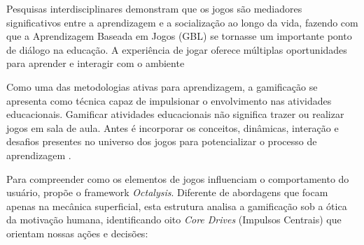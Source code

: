 Pesquisas interdisciplinares demonstram que os jogos são mediadores significativos entre a aprendizagem e a socialização ao longo da vida, fazendo com que a Aprendizagem Baseada em Jogos (GBL) se tornasse um importante ponto de diálogo na educação. A experiência de jogar oferece múltiplas oportunidades para aprender e interagir com o ambiente \cite{magtani2024design}

Como uma das metodologias ativas para aprendizagem, a gamificação se apresenta como técnica capaz de impulsionar o envolvimento nas atividades educacionais. Gamificar atividades educacionais não significa trazer ou realizar jogos em sala de aula. Antes é incorporar os conceitos, dinâmicas, interação e desafios presentes no universo dos jogos para potencializar o processo de aprendizagem \cite{souza2025metodologias}.

Para compreender como os elementos de jogos influenciam o comportamento do usuário,  propõe o framework \textit{Octalysis}. Diferente de abordagens que focam apenas na mecânica superficial, esta estrutura analisa a gamificação sob a ótica da motivação humana, identificando oito \textit{Core Drives} (Impulsos Centrais) que orientam nossas ações e decisões:


